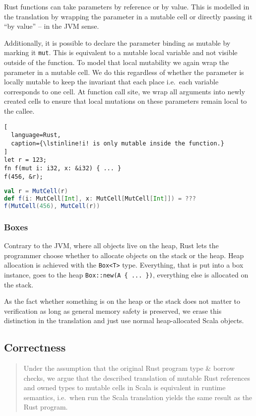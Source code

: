 Rust functions can take parameters by reference or by value. This is modelled in
the translation by wrapping the parameter in a mutable cell or directly passing
it ``by value'' -- in the JVM sense.

Additionally, it is possible to declare the parameter binding as mutable
by marking it \passthrough{\lstinline!mut!}. This is equivalent to a
mutable local variable and not visible outside of the function. To model
that local mutability we again wrap the parameter in a mutable cell. We
do this regardless of whether the parameter is locally mutable to keep
the invariant that each place i.e.~each variable corresponds to one
cell. At function call site, we wrap all arguments into newly created
cells to ensure that local mutations on these parameters remain local to
the callee.

\begin{lstlisting}[
  language=Rust,
  caption={\lstinline!i! is only mutable inside the function.}
]
let r = 123;
fn f(mut i: i32, x: &i32) { ... }
f(456, &r);
\end{lstlisting}

\begin{lstlisting}[language=Scala]
val r = MutCell(r)
def f(i: MutCell[Int], x: MutCell[MutCell[Int]]) = ???
f(MutCell(456), MutCell(r))
\end{lstlisting}

\subsubsection{Boxes}

Contrary to the JVM, where all objects live on the heap, Rust lets the
programmer choose whether to allocate objects on the stack or the heap.
Heap allocation is achieved with the \passthrough{\lstinline!Box<T>!}
type. Everything, that is put into a box instance, goes to the heap
\passthrough{\lstinline!Box::new(A \{ ... \})!}, everything else is
allocated on the stack.

As the fact whether something is on the heap or the stack does not
matter to verification as long as general memory safety is preserved, we
erase this distinction in the translation and just use normal
heap-allocated Scala objects.

\subsection{Correctness}
\label{correctness-claim}

\begin{quote}
Under the assumption that the original Rust program type \& borrow
checks, we argue that the described translation of mutable Rust
references and owned types to mutable cells in Scala is equivalent in
runtime semantics, i.e.~when run the Scala translation yields the same
result as the Rust program.
\end{quote}

